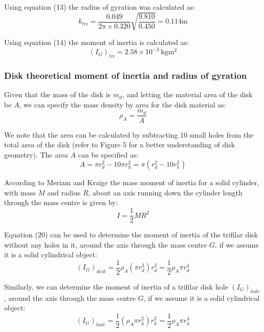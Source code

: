 \documentclass[a4paper]{article}
\begin{document}
Using equation (13) the radius of gyration was calculated as:
\begin{equation}
k_{tri} = \frac{0.049}{2 \pi \times 0.320}\sqrt{\frac{9.810}{0.450}} = 0.114\si{\meter}
\end{equation}

Using equation (14) the moment of inertia is calculated as:
\begin{equation}
(I_G)_{tri} = 2.58 \times 10^{-3} \ \si{\kilogram\meter^2}
\end{equation}

\subsubsection{Disk theoretical moment of inertia and radius of gyration}
Given that the mass of the disk is $m_d$, and letting the material area of the disk be $A$, we can specify the mass density by area for the disk material as:
\begin{equation}
	\rho_A = \frac{m_d}{A}
\end{equation}

We note that the area can be calculated by subtracting 10 small holes from the total area of the disk (refer to Figure 5 for a better understanding of disk geometry). The area $A$ can be specified as:
\begin{equation}
	A = \pi r_d^2 - 10 \pi r_h^2 = \pi (r_d^2 - 10 r_h^2)
\end{equation}

According to Meriam and Kraige \cite{Meriam:2000} the mass moment of inertia for a solid cylinder, with mass $M$ and radius $R$, about an axis running down the cylinder length through the mass centre is given by:
\begin{equation}
I = \frac{1}{2}MR^2
\end{equation}

Equation (20) can be used to determine the moment of inertia of the trifilar disk without any holes in it, around the axis through the mass centre $G$, if we assume it is a solid cylindrical object:
\begin{equation}
(I_G)_{disk} = \frac{1}{2} \rho_A (\pi r_d^2) r_d^2 = \frac{1}{2} \rho_A \pi r_d^4
\end{equation}

Similarly, we can determine the moment of inertia of a trifilar disk hole $(I_G)_{hole}$, around the axis through the mass centre $G$, if we assume it is a solid cylindrical object:
\begin{equation}
(I_G)_{hole} = \frac{1}{2} (\rho_A \pi r_h^2) r_h^2 = \frac{1}{2} \rho_A \pi r_h^4
\end{equation}
\end{document}
